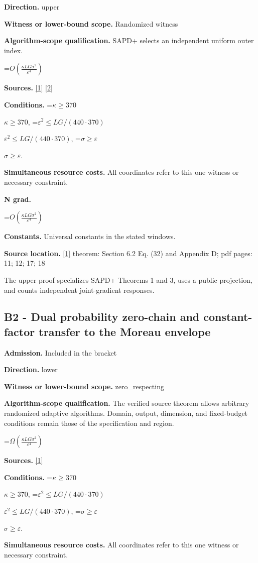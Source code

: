 \documentclass[10pt,a4paper]{article}
\newcommand{\AtlasMath}[1]{\par\begingroup\centering\setbox0=\hbox{$\displaystyle #1$}\ifdim\wd0>1.4\linewidth\typeout{ATLAS WIDE FORMULA: \the\wd0}\fi\ifdim\wd0>\linewidth\resizebox{\linewidth}{!}{\box0}\else\box0\fi\par\endgroup}
\newcommand{\AtlasInlineMath}[1]{\begingroup\setbox0=\hbox{$#1$}\ifdim\wd0>.4\linewidth\endgroup\AtlasMath{#1}\else\endgroup$#1$\fi}
\begin{document}
\textbf{Direction.} upper

\textbf{Witness or lower-bound scope.} Randomized witness

\textbf{Algorithm-scope qualification.} SAPD+ selects an independent uniform outer index.

\AtlasMath{O\!\left(\frac{\kappa L G\sigma^2}{\varepsilon^4}\right)}
\textbf{Sources.} \href{https://arxiv.org/pdf/2609.30877}{[1]} \href{https://arxiv.org/abs/2205.15084v4}{[2]}

\textbf{Conditions.} \AtlasInlineMath{\kappa\ge370}, \AtlasInlineMath{\varepsilon^2\le LG/(440\cdot370)}, \AtlasInlineMath{\sigma\ge\varepsilon}.

\textbf{Simultaneous resource costs.} All coordinates refer to this one witness or necessary constraint.

\textbf{N grad.}

\AtlasMath{O\!\left(\frac{\kappa L G\sigma^2}{\varepsilon^4}\right)}
\textbf{Constants.} Universal constants in the stated windows.

\textbf{Source location.} \href{https://arxiv.org/pdf/2609.30877}{[1]} theorem: Section 6.2 Eq. (32) and Appendix D; pdf pages: 11; 12; 17; 18

The upper proof specializes SAPD+ Theorems 1 and 3, uses a public projection, and counts independent joint-gradient responses.

\subsection{B2 - Dual probability zero-chain and constant-factor transfer to the Moreau envelope}
\textbf{Admission.} Included in the bracket

\textbf{Direction.} lower

\textbf{Witness or lower-bound scope.} zero\_respecting

\textbf{Algorithm-scope qualification.} The verified source theorem allows arbitrary randomized adaptive algorithms. Domain, output, dimension, and fixed-budget conditions remain those of the specification and region.

\AtlasMath{\Omega\!\left(\frac{\kappa L G\sigma^2}{\varepsilon^4}\right)}
\textbf{Sources.} \href{https://arxiv.org/pdf/2609.30877}{[1]}

\textbf{Conditions.} \AtlasInlineMath{\kappa\ge370}, \AtlasInlineMath{\varepsilon^2\le LG/(440\cdot370)}, \AtlasInlineMath{\sigma\ge\varepsilon}.

\textbf{Simultaneous resource costs.} All coordinates refer to this one witness or necessary constraint.
\end{document}
